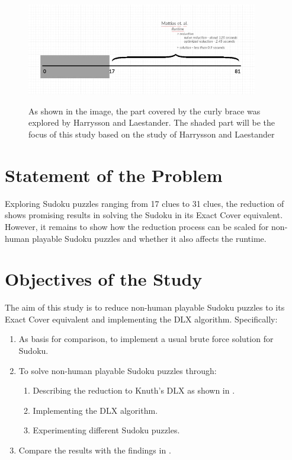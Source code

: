 \documentclass[a4paper,oneside,11pt]{report}
\begin{document}
\begin{figure}[h]
  \centering
  {\includegraphics[width=0.9\textwidth]{framework.jpg}\label{fig:framework}}
  \caption{As shown in the image, the part covered by the curly brace was explored by Harrysson and Laestander. The shaded part will be the focus of this study based on the study of Harrysson and Laestander}
\end{figure}

\section{Statement of the Problem}
Exploring Sudoku puzzles ranging from 17 clues to 31 clues, the reduction of \cite{Harrysson} shows promising results in solving the Sudoku in its Exact Cover equivalent. However, it remains to show how the reduction process can be scaled for non-human playable Sudoku puzzles and whether it also affects the runtime.\\

\section{Objectives of the Study}
The aim of this study is to reduce non-human playable Sudoku puzzles to its Exact Cover equivalent and implementing the DLX algorithm. Specifically:
\begin{enumerate}
\item As basis for comparison, to implement a usual brute force solution for Sudoku.
\item To solve non-human playable Sudoku puzzles through:
\begin{enumerate}
\item Describing the reduction to Knuth$’$s DLX as shown in \cite{Harrysson}.
\item Implementing the DLX algorithm.
\item Experimenting different Sudoku puzzles.
\end{enumerate}
\item Compare the results with the findings in \cite{Harrysson}.
\end{enumerate}
\end{document}
